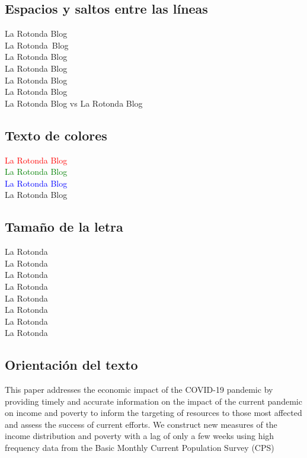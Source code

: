 \documentclass{article}
\begin{document}
        \subsection{Espacios y saltos entre las líneas}
            La Rotonda Blog\\
            La Rotonda\, Blog\\
                \smallskip
            La Rotonda \enskip Blog\\
                \medskip
            La Rotonda \quad  Blog\\
                \bigskip
            La Rotonda \qquad Blog\\
                \vspace{5cm}
            La Rotonda \hspace{5cm} Blog\\
                
            La Rotonda Blog \hfill vs \hfill La Rotonda Blog
        
        \subsection{Texto de colores}
            \textcolor{red}{La Rotonda Blog}\\
            \textcolor{green}{La Rotonda Blog}\\
            \textcolor{blue}{La Rotonda Blog}\\
            \textcolor{rojito}{La Rotonda Blog}\\
            
        \subsection{Tamaño de la letra}
            {\tiny La Rotonda}\\
            {\small La Rotonda}\\
            La Rotonda \\
            {\large La Rotonda}\\
            {\Large La Rotonda}\\
            {\LARGE La Rotonda}\\
            {\huge La Rotonda}\\
            {\Huge La Rotonda}
        
        \subsection{Orientación del texto}
            This paper addresses the economic impact of the COVID-19 pandemic by providing timely and accurate information on the impact of the current pandemic on income and poverty to inform the targeting of resources to those most affected and assess the success of current efforts. We construct new measures of the income distribution and poverty with a lag of only a few weeks using high frequency data from the Basic Monthly Current Population Survey (CPS) \citep{Flores2005}
            
\end{document}
